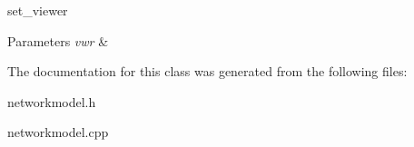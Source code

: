 set\+\_\+viewer 


\begin{DoxyParams}{Parameters}
{\em vwr} & \\
\hline
\end{DoxyParams}


The documentation for this class was generated from the following files\+:\begin{DoxyCompactItemize}
\item 
networkmodel.\+h\item 
networkmodel.\+cpp\end{DoxyCompactItemize}
